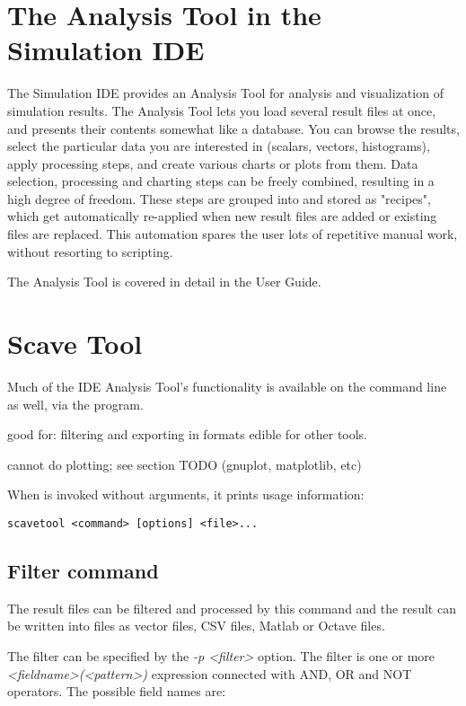 \section{The Analysis Tool in the Simulation IDE}

The Simulation IDE provides an Analysis Tool for analysis and visualization
of simulation results. The Analysis Tool lets you load several result files
at once, and presents their contents somewhat like a database. You can
browse the results, select the particular data you are interested in
(scalars, vectors, histograms), apply processing steps, and create various
charts or plots from them. Data selection, processing and charting steps
can be freely combined, resulting in a high degree of freedom.
These steps are grouped into and stored as "recipes", which get automatically
re-applied when new result files are added or existing files are
replaced. This automation spares the user lots of repetitive manual work,
without resorting to scripting.

The Analysis Tool is covered in detail in the User Guide.


\section{Scave Tool}
\label{sec:ana-sim:scavetool}

Much of the IDE Analysis Tool's functionality is available on the command
line as well, via the  program.


good for: filtering and exporting in formats edible for other tools.

cannot do plotting; see section TODO (gnuplot, matplotlib, etc)



When  is invoked without arguments, it prints usage information:

\begin{verbatim}
scavetool <command> [options] <file>...
\end{verbatim}

\subsection{Filter command}

The result files can be filtered and processed by this command and the
result can be written into files as vector files, CSV files,
Matlab or Octave files.

The filter can be specified by the {\itshape -p <filter>} option.
The filter is one or more {\itshape <fieldname>(<pattern>)} expression
connected with AND, OR and NOT operators. The possible field names are:

